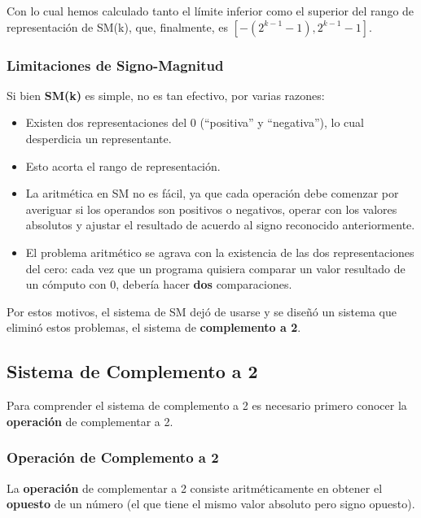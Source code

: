 \documentclass[spanish,A4,]{article}
\begin{document}
Con lo cual hemos calculado tanto el límite inferior como el superior
del rango de representación de SM(k), que, finalmente, es
$[-(2^{k-1}-1),2^{k-1}-1]$.

\subsubsection{Limitaciones de
Signo-Magnitud}\label{limitaciones-de-signo-magnitud}

Si bien \textbf{SM(k)} es simple, no es tan efectivo, por varias
razones:

\begin{itemize}
\itemsep1pt\parskip0pt
\item
  Existen dos representaciones del 0 (``positiva'' y ``negativa''), lo
  cual desperdicia un representante.
\item
  Esto acorta el rango de representación.
\item
  La aritmética en SM no es fácil, ya que cada operación debe comenzar
  por averiguar si los operandos son positivos o negativos, operar con
  los valores absolutos y ajustar el resultado de acuerdo al signo
  reconocido anteriormente.
\item
  El problema aritmético se agrava con la existencia de las dos
  representaciones del cero: cada vez que un programa quisiera comparar
  un valor resultado de un cómputo con 0, debería hacer \textbf{dos}
  comparaciones.
\end{itemize}

Por estos motivos, el sistema de SM dejó de usarse y se diseñó un
sistema que eliminó estos problemas, el sistema de \textbf{complemento a
2}.

\subsection{Sistema de Complemento a
2}\label{sistema-de-complemento-a-2}

Para comprender el sistema de complemento a 2 es necesario primero
conocer la \textbf{operación} de complementar a 2.

\subsubsection{Operación de Complemento a
2}\label{operaciuxf3n-de-complemento-a-2}

La \textbf{operación} de complementar a 2 consiste aritméticamente en
obtener el \textbf{opuesto} de un número (el que tiene el mismo valor
absoluto pero signo opuesto).
\end{document}

